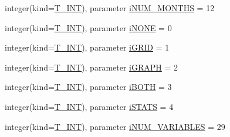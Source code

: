 \begin{DoxyCompactItemize}
\item 
integer(kind=\hyperlink{namespacetypes_a4e4d040a4425196c4d43be63e7e6103a}{T\_\-INT}), parameter \hyperlink{namespacetypes_a3fa6b4fbd911543da65649a0f5ec7ded}{iNUM\_\-MONTHS} = 12
\item 
integer(kind=\hyperlink{namespacetypes_a4e4d040a4425196c4d43be63e7e6103a}{T\_\-INT}), parameter \hyperlink{namespacetypes_a000bcd3b779441ad55f9fa83e6522f24}{iNONE} = 0
\item 
integer(kind=\hyperlink{namespacetypes_a4e4d040a4425196c4d43be63e7e6103a}{T\_\-INT}), parameter \hyperlink{namespacetypes_a187237a0372eaebca7e88b3c00e0c110}{iGRID} = 1
\item 
integer(kind=\hyperlink{namespacetypes_a4e4d040a4425196c4d43be63e7e6103a}{T\_\-INT}), parameter \hyperlink{namespacetypes_a94f1aafe474b6e3e8dc2782d3d84b55f}{iGRAPH} = 2
\item 
integer(kind=\hyperlink{namespacetypes_a4e4d040a4425196c4d43be63e7e6103a}{T\_\-INT}), parameter \hyperlink{namespacetypes_acdb6a8e28292f829f0e39938283a434a}{iBOTH} = 3
\item 
integer(kind=\hyperlink{namespacetypes_a4e4d040a4425196c4d43be63e7e6103a}{T\_\-INT}), parameter \hyperlink{namespacetypes_af7f37d0a4b61a411aa5759a66973dc62}{iSTATS} = 4
\item 
integer(kind=\hyperlink{namespacetypes_a4e4d040a4425196c4d43be63e7e6103a}{T\_\-INT}), parameter \hyperlink{namespacetypes_a9fd35718050c56c63e14d03fb07b62b3}{iNUM\_\-VARIABLES} = 29
\item 

\end{DoxyCompactItemize}
